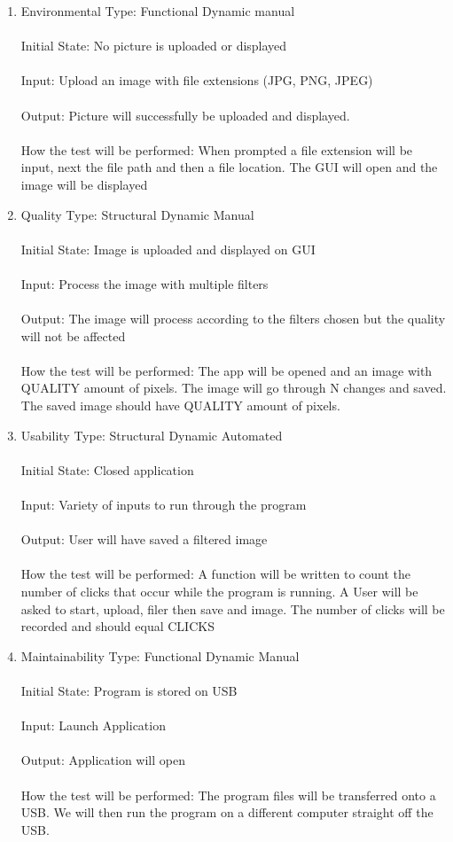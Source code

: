 \documentclass[12pt, titlepage]{article}
\begin{document}
\begin{enumerate}
\item{Environmental}
Type: Functional Dynamic manual\\ \\
Initial State: No picture is uploaded or displayed \\ \\
Input: Upload an image with file extensions (JPG, PNG, JPEG) \\ \\
Output: Picture will successfully be uploaded and displayed. \\ \\
How the test will be performed: When prompted a file extension will be input, next the file path and then a file location. The GUI will open and the image will be displayed

\item{Quality}
Type: Structural Dynamic Manual\\ \\
Initial State: Image is uploaded and displayed on GUI\\ \\
Input: Process the image with multiple filters\\ \\
Output: The image will process according to the filters chosen but the quality will not be affected\\ \\
How the test will be performed: The app will be opened and an image with QUALITY amount of pixels. The image will go through N changes and saved. The saved image should have QUALITY amount of pixels.

\item{Usability}
Type: Structural Dynamic Automated\\ \\
Initial State: Closed application\\ \\
Input: Variety of inputs to run through the program\\ \\
Output: User will have saved a filtered image\\ \\
How the test will be performed: A function will be written to count the number of clicks that occur while the program is running. A User will be asked to start, upload, filer then save and image. The number of clicks will be recorded and should equal CLICKS

\item{Maintainability}
Type: Functional Dynamic Manual\\ \\
Initial State: Program is stored on USB\\ \\
Input: Launch Application\\ \\
Output: Application will open\\ \\
How the test will be performed: The program files will be transferred onto a USB. We will then run the program on a different computer straight off the USB.


\end{enumerate}
\end{document}

